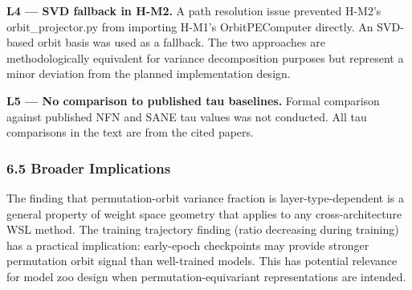 \textbf{L4 — SVD fallback in H-M2.} A path resolution issue prevented H-M2's orbit_projector.py from importing H-M1's OrbitPEComputer directly. An SVD-based orbit basis was used as a fallback. The two approaches are methodologically equivalent for variance decomposition purposes but represent a minor deviation from the planned implementation design.

\textbf{L5 — No comparison to published tau baselines.} Formal comparison against published NFN and SANE tau values was not conducted. All tau comparisons in the text are from the cited papers.

\subsubsection{6.5 Broader Implications}

The finding that permutation-orbit variance fraction is layer-type-dependent is a general property of weight space geometry that applies to any cross-architecture WSL method. The training trajectory finding (ratio decreasing during training) has a practical implication: early-epoch checkpoints may provide stronger permutation orbit signal than well-trained models. This has potential relevance for model zoo design when permutation-equivariant representations are intended.

